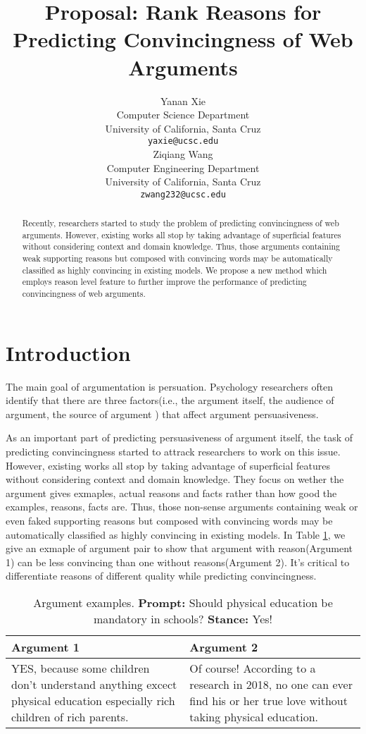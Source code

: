 \documentclass[11pt,a4paper]{article}
\title{Proposal: Rank Reasons for Predicting Convincingness of Web Arguments}
\author{Yanan Xie \\
Computer Science Department\\
University of California, Santa Cruz\\
  {\tt yaxie@ucsc.edu} \\\And
  Ziqiang Wang \\
Computer Engineering Department\\
University of California, Santa Cruz\\
  {\tt zwang232@ucsc.edu} \\}
\date{}
\begin{document}
\maketitle
\begin{abstract}
Recently, researchers started to study the problem of predicting convincingness of web arguments. However, existing works all stop by taking advantage of superficial features without considering context and domain knowledge. Thus, those arguments containing weak supporting reasons but composed with convincing words may be automatically classified as highly convincing in existing models. We propose a new method which employs reason level feature to further improve the performance of predicting convincingness of web arguments.
\end{abstract}

\section{Introduction}

The main goal of argumentation is persuation\cite{nettel2012persuasive, mercier2011humans, blair2012argumentation}. Psychology researchers often identify that there are three factors(i.e., the argument itself, the audience of argument, the source of argument ) that affect argument persuasiveness\cite{petty1986elaboration}. 

As an important part of predicting persuasiveness of argument itself, the task of predicting convincingness started to attrack researchers to work on this issue\cite{habernal2016argument}. However, existing works all stop by taking advantage of superficial features without considering context and domain knowledge. They focus on wether the argument gives exmaples, actual reasons and facts rather than how good the examples, reasons, facts are. Thus, those non-sense arguments containing weak or even faked supporting reasons but composed with convincing words may be automatically classified as highly convincing in existing models. In Table \ref{table:argumentexamples}, we give an exmaple of argument pair to show that argument with reason(Argument 1) can be less convincing than one without reasons(Argument 2). It's critical to differentiate reasons of different quality while predicting convincingness. 

\begin{table}[h]
\begin{tabular}{| p{3.5cm} | p{3.5cm} | }
\hline
{\bf Argument 1} & {\bf Argument 2} \\
\hline
YES, because some children don’t understand anything excect physical education especially rich children of rich parents. & Of course!  According to a research in 2018, no one can ever find his or her true love without taking physical education.\\
\hline

\end{tabular}
\caption{Argument examples. {\bf Prompt:} Should physical education be mandatory in schools? {\bf Stance:} Yes!} 
\label{table:argumentexamples}
\end{table}
\end{document}
